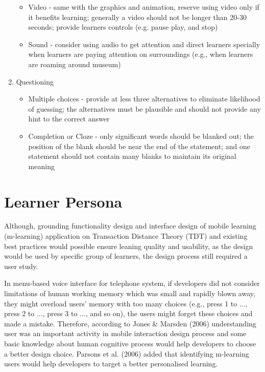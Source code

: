 \begin{enumerate}
\begin{itemize}
\item Video - same with the graphics and animation, reserve using video only if it benefits learning; generally a video should not be longer than 20-30 seconds; provide learners controls (e.g. pause play, and stop)
\item Sound - consider using audio to get attention and direct learners specially when learners are paying attention on surroundings (e.g., when learners are roaming around museum)
\end{itemize} 
\item Questioning 
\begin{itemize} 
\item Multiple choices - provide at less three alternatives to eliminate likelihood of guessing; the alternatives must be plausible and should not provide any hint to the correct answer
\item Completion or Cloze - only significant words should be blanked out; the position of the blank should be near the end of the statement; and one statement should not contain many blanks to maintain its original meaning
\end{itemize} 
\end{enumerate} 
















\newpage
\section{Learner Persona}

Although, grounding functionality design and interface design of mobile learning (m-learning) application on Transaction Distance Theory (TDT) and existing best practices would possible ensure leaning quality and usability, as the design would be used by specific group of learners, the design process still required a user study. 


 In menu-based voice interface for telephone system, if developers did not consider limitations of human working memory which was small and rapidly blown away, they might overload users' memory with too many choices (e.g., press 1 to ..., press 2 to ..., press 3 to ..., and so on), the users might forget these choices and made a mistake. Therefore, according to Jones \& Marsden (2006) \cite{jones2006mobile} understanding user was an important activity in mobile interaction design process and some basic knowledge about human cognitive process would help developers to choose a better design choice. Parsons et al. (2006) \cite{parsons2006study} added that identifying m-learning users would help developers to target a better personalised learning. 

